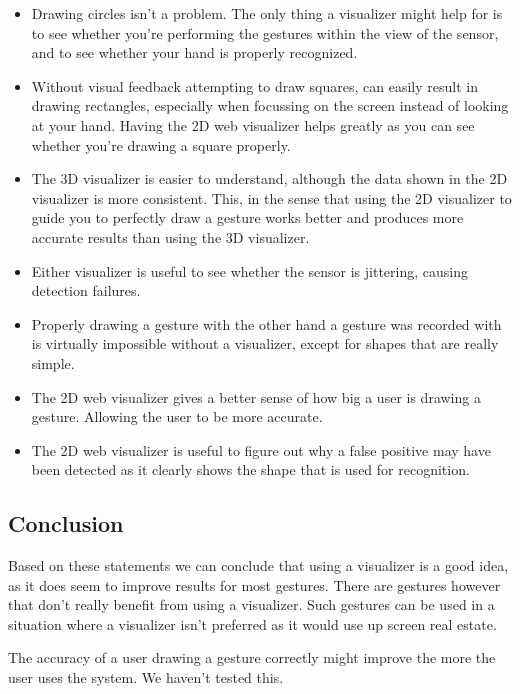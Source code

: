 \documentclass[a4paper]{article}
\begin{document}
  \begin{itemize}
    \item Drawing circles isn't a problem. The only thing a visualizer might
      help for is to see whether you're performing the gestures within the
      view of the sensor, and to see whether your hand is properly recognized.
    \item Without visual feedback attempting to draw squares, can easily result
      in drawing rectangles, especially when focussing on the screen instead of
      looking at your hand. Having the 2D web visualizer helps greatly as you
      can see whether you're drawing a square properly.
    \item The 3D visualizer is easier to understand, although the data shown in
      the 2D visualizer is more consistent. This, in the sense that using the 2D
      visualizer to guide you to perfectly draw a gesture works better and
      produces more accurate results than using the 3D visualizer.
    \item Either visualizer is useful to see whether the sensor is
      jittering, causing detection failures.
    \item Properly drawing a gesture with the other hand a gesture was
      recorded with is virtually impossible without a visualizer, except for
      shapes that are really simple.
    \item The 2D web visualizer gives a better sense of how big a user is
      drawing a gesture. Allowing the user to be more accurate.
    \item The 2D web visualizer is useful to figure out why a false positive may
      have been detected as it clearly shows the shape that is used for
      recognition.
  \end{itemize}

  \subsection*{Conclusion}
  Based on these statements we can conclude that using a visualizer is a good
  idea, as it does seem to improve results for most gestures. There are gestures
  however that don't really benefit from using a visualizer. Such gestures can
  be used in a situation where a visualizer isn't preferred as it would use up
  screen real estate.

  The accuracy of a user drawing a gesture correctly might improve the more the
  user uses the system. We haven't tested this.
\end{document}
